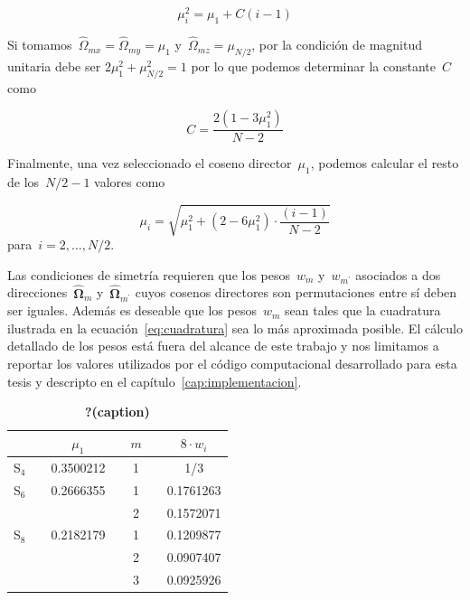 \documentclass[
  12pt,
  a4paper,
  table]{scrbook}
\theoremstyle{plain}
\theoremstyle{definition}
\theoremstyle{plain}
\theoremstyle{plain}
\theoremstyle{remark}
\begin{document}
\[\mu_i^2 = \mu_{1} + C(i-1)\]

Si tomamos~\(\hat{\Omega}_{mx} = \hat{\Omega}_{my} = \mu_1\)
y~\(\hat{\Omega}_{mz}=\mu_{N/2}\), por la condición de magnitud unitaria
debe ser \(2\mu_1^2 + \mu_{N/2}^2 = 1\) por lo que podemos determinar la
constante~\(C\) como

\[C = \frac{2 (1 - 3\mu_1^2)}{N-2}\]

Finalmente, una vez seleccionado el coseno director~\(\mu_1\), podemos
calcular el resto de los~\(N/2-1\) valores como

\[\label{eq:cosenos}
 \mu_{i} = \sqrt{\mu_1^2 + (2 - 6\mu_1^2) \cdot \frac{(i-1)}{N-2}}\]
para~\(i=2,\dots,N/2\).

Las condiciones de simetría requieren que los pesos~\(w_m\)
y~\(w_{m^\prime}\) asociados a dos
direcciones~\(\boldsymbol{\hat\Omega}_m\)
y~\(\boldsymbol{\hat\Omega}_{m^\prime}\) cuyos cosenos directores son
permutaciones entre sí deben ser iguales. Además es deseable que los
pesos~\(w_m\) sean tales que la cuadratura ilustrada en la
ecuación~\protect\hyperlink{eq:cuadratura}{{[}eq:cuadratura{]}} sea lo
más aproximada posible. El cálculo detallado de los pesos está fuera del
alcance de este trabajo y nos limitamos a reportar los valores
utilizados por el código computacional desarrollado para esta tesis y
descripto en el
capítulo~\protect\hyperlink{cap:implementacion}{{[}cap:implementacion{]}}.

\begin{table}

\begin{minipage}[t]{\linewidth}

{\centering 

\begin{tabular}[t]{llclclc}
\toprule
 &  & \(\mu_1\) &  & \(m\) &  & \(8 \cdot w_i\)\\
\midrule
S\(_4\) &  & 0.3500212 &  & 1 &  & 1/3\\
S\(_6\) &  & 0.2666355 &  & 1 &  & 0.1761263\\
 &  &  &  & 2 &  & 0.1572071\\
S\(_8\) &  & 0.2182179 &  & 1 &  & 0.1209877\\
 &  &  &  & 2 &  & 0.0907407\\
 &  &  &  & 3 &  & 0.0925926\\
\bottomrule
\end{tabular}

}

\end{minipage}%

\caption{\label{tbl-quadratureset}\textbf{?(caption)}}

\end{table}
\end{document}
